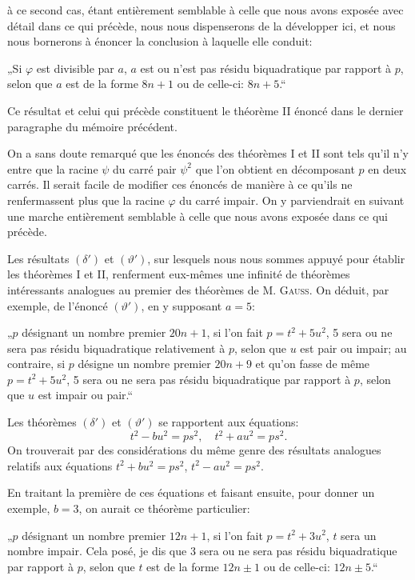 \noindent
à ce second cas, étant entièrement semblable à celle que nous avons exposée
avec détail dans ce qui précède, nous nous dispenserons de la développer ici,
et nous nous bornerons à énoncer la conclusion à laquelle elle conduit:
\par\indent
„Si $\varphi$ est divisible par $a$, $a$ est ou n'est pas résidu biquadratique par
rapport à $p$, selon que $a$ est de la forme $8n+1$ ou de celle-ci: $8n+5$.“
\par\indent
Ce résultat et celui qui précède constituent le théorème II énoncé dans
le dernier paragraphe du mémoire précédent.
\par\indent
On a sans doute remarqué que les énoncés des théorèmes I et II sont
tels qu'il n'y entre que la racine $\psi$ du carré pair $\psi^2$ que l'on obtient en décomposant
$p$ en deux carrés. Il serait facile de modifier ces énoncés de manière
à ce qu'ils ne renfermassent plus que la racine $\varphi$ du carré impair. On
y parviendrait en suivant une marche entièrement semblable à celle que nous
avons exposée dans ce qui précède.
\par\indent
Les résultats $(\delta')$ et $(\vartheta')$, sur lesquels nous nous sommes appuyé pour
établir les théorèmes I et II, renferment eux-mêmes une infinité de théorèmes
intéressants analogues au premier des théorèmes de M. \textsc{Gauss}. On déduit, par
exemple, de l'énoncé $(\vartheta')$, en y supposant $a=5$:
\par\indent
„$p$ désignant un nombre premier $20n+1$, si l'on fait $p=t^2+5u^2$,
5 sera ou ne sera pas résidu biquadratique relativement à $p$, selon que $u$ est
pair ou impair; au contraire, si $p$ désigne un nombre premier $20n+9$ et qu'on
fasse de même $p=t^2+5u^2$, 5 sera ou ne sera pas résidu biquadratique par
rapport à $p$, selon que $u$ est impair ou pair.“
\par\indent
Les théorèmes $(\delta')$ et $(\vartheta')$ se rapportent aux équations:
\[
t^2-bu^2=ps^2,\quad t^2+au^2=ps^2.
\]
On trouverait par des considérations du même genre des résultats analogues
relatifs aux équations $t^2+bu^2=ps^2$, $t^2-au^2=ps^2$.
\par\indent
En traitant la première de ces équations et faisant ensuite, pour donner
un exemple, $b=3$, on aurait ce théorème particulier:
\par\indent
„$p$ désignant un nombre premier $12n+1$, si l'on fait $p=t^2+3u^2$, $t$
sera un nombre impair. Cela posé, je dis que 3 sera ou ne sera pas résidu
biquadratique par rapport à $p$, selon que $t$ est de la forme $12n\pm1$ ou de
celle-ci: $12n\pm5$.“
\par\vspace{16pt}{\centering\rule{.24\linewidth}{.3pt}\par}
